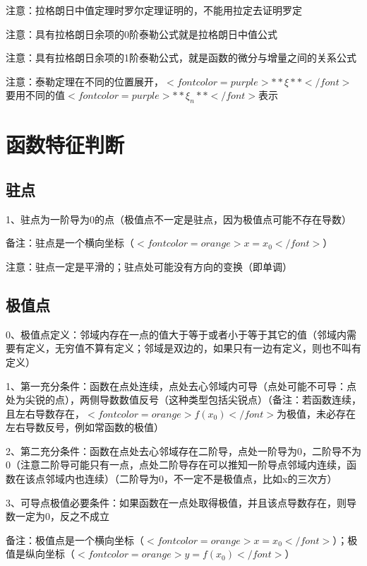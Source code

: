 注意：拉格朗日中值定理时罗尔定理证明的，不能用拉定去证明罗定

注意：具有拉格朗日余项的0阶泰勒公式就是拉格朗日中值公式

注意：具有拉格朗日余项的1阶泰勒公式，就是函数的微分与增量之间的关系公式

注意：泰勒定理在不同的位置展开，$ <font color=purple>**\xi**</font> $要用不同的值$ <font color=purple>**\xi_n**</font> $表示

\section{函数特征判断}



\subsection{驻点}

1、驻点为一阶导为0的点（极值点不一定是驻点，因为极值点可能不存在导数）

备注：驻点是一个横向坐标（$ <font color=orange>x=x_0</font> $）

注意：驻点一定是平滑的；驻点处可能没有方向的变换（即单调）



\subsection{极值点}

0、极值点定义：邻域内存在一点的值大于等于或者小于等于其它的值（邻域内需要有定义，无穷值不算有定义；邻域是双边的，如果只有一边有定义，则也不叫有定义）

1、第一充分条件：函数在点处连续，点处去心邻域内可导（点处可能不可导：点处为尖锐的点），两侧导数数值反号（这种类型包括尖锐点）（备注：若函数连续，且左右导数存在，$ <font color=orange>f(x_0)</font> $为极值，未必存在左右导数反号，例如常函数的极值）

2、第二充分条件：函数在点处去心邻域存在二阶导，点处一阶导为0，二阶导不为0（注意二阶导可能只有一点，点处二阶导存在可以推知一阶导点邻域内连续，函数在该点邻域内也连续）（二阶导为0，不一定不是极值点，比如x的三次方）

3、可导点极值必要条件：如果函数在一点处取得极值，并且该点导数存在，则导数一定为0，反之不成立

备注：极值点是一个横向坐标（$ <font color=orange>x=x_0</font> $）；极值是纵向坐标（$ <font color=orange>y=f(x_0)</font> $）

